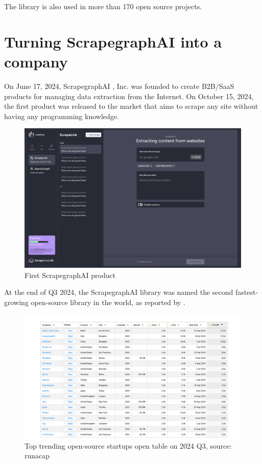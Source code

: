 The library is also used in more than 170 open source projects.
\section{Turning ScrapegraphAI  into a company}
On June 17, 2024, ScrapegraphAI , Inc. was founded to create B2B/SaaS products for managing data extraction from the Internet.
On October 15, 2024, the first product was released to the market that aims to scrape any site without having any programming knowledge.

\begin{figure}[h!]
    \centering
    \includegraphics[width=1\linewidth]{Assets/webapp.png}
    \caption{First ScrapegraphAI  product}
    \label{fig:enter-label}
\end{figure}

At the end of Q3 2024, the ScrapegraphAI  library was named the second fastest-growing open-source library in the world, as reported by \cite{18}.

\begin{figure}[h!]
    \centering
    \includegraphics[width=0.95\linewidth]{Assets/growing_companies.png}
    \caption{Top trending open-source startups open table on 2024 Q3, source: runacap}
    \label{fig:enter-label}

\end{figure}

